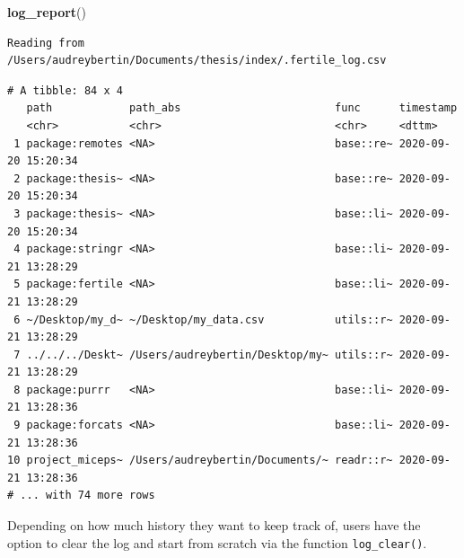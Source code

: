 \documentclass[12pt,twoside]{reedthesis}
\newenvironment{Shaded}{\begin{snugshade}}{\end{snugshade}}
\newcommand{\KeywordTok}[1]{\textcolor[rgb]{0.13,0.29,0.53}{\textbf{#1}}}
\newcommand{\NormalTok}[1]{#1}
\begin{document}
\footnotesize
\begin{Shaded}
\begin{Highlighting}[]
\KeywordTok{log_report}\NormalTok{()}
\end{Highlighting}
\end{Shaded}
\begin{verbatim}
Reading from /Users/audreybertin/Documents/thesis/index/.fertile_log.csv
\end{verbatim}
\begin{verbatim}
# A tibble: 84 x 4
   path            path_abs                        func      timestamp          
   <chr>           <chr>                           <chr>     <dttm>             
 1 package:remotes <NA>                            base::re~ 2020-09-20 15:20:34
 2 package:thesis~ <NA>                            base::re~ 2020-09-20 15:20:34
 3 package:thesis~ <NA>                            base::li~ 2020-09-20 15:20:34
 4 package:stringr <NA>                            base::li~ 2020-09-21 13:28:29
 5 package:fertile <NA>                            base::li~ 2020-09-21 13:28:29
 6 ~/Desktop/my_d~ ~/Desktop/my_data.csv           utils::r~ 2020-09-21 13:28:29
 7 ../../../Deskt~ /Users/audreybertin/Desktop/my~ utils::r~ 2020-09-21 13:28:29
 8 package:purrr   <NA>                            base::li~ 2020-09-21 13:28:36
 9 package:forcats <NA>                            base::li~ 2020-09-21 13:28:36
10 project_miceps~ /Users/audreybertin/Documents/~ readr::r~ 2020-09-21 13:28:36
# ... with 74 more rows
\end{verbatim}
\normalsize

Depending on how much history they want to keep track of, users have the
option to clear the log and start from scratch via the function
\texttt{log\_clear()}.
\end{document}
